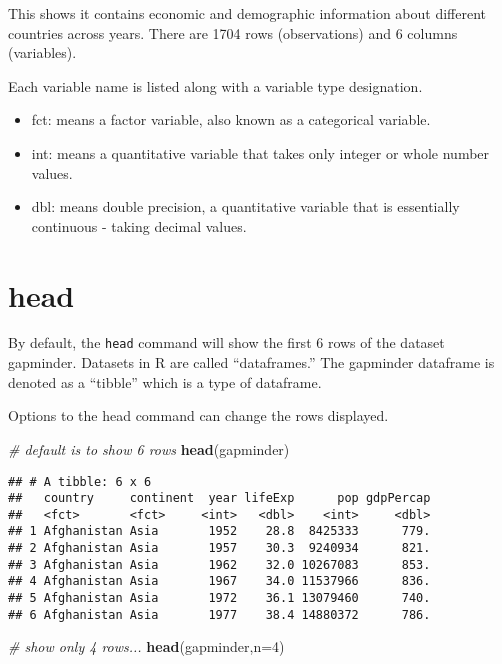 \documentclass[]{book}
\newenvironment{Shaded}{\begin{snugshade}}{\end{snugshade}}
\newcommand{\KeywordTok}[1]{\textcolor[rgb]{0.13,0.29,0.53}{\textbf{#1}}}
\newcommand{\DataTypeTok}[1]{\textcolor[rgb]{0.13,0.29,0.53}{#1}}
\newcommand{\DecValTok}[1]{\textcolor[rgb]{0.00,0.00,0.81}{#1}}
\newcommand{\CommentTok}[1]{\textcolor[rgb]{0.56,0.35,0.01}{\textit{#1}}}
\newcommand{\NormalTok}[1]{#1}
\providecommand{\tightlist}{%
  \setlength{\itemsep}{0pt}\setlength{\parskip}{0pt}}
\begin{document}
This shows it contains economic and demographic information about
different countries across years. There are 1704 rows (observations) and
6 columns (variables).

Each variable name is listed along with a variable type designation.

\begin{itemize}
\tightlist
\item
  fct: means a factor variable, also known as a categorical variable.
\item
  int: means a quantitative variable that takes only integer or whole
  number values.
\item
  dbl: means double precision, a quantitative variable that is
  essentially continuous - taking decimal values.
\end{itemize}

\section{head}\label{head}

By default, the \texttt{head} command will show the first 6 rows of the
dataset gapminder. Datasets in R are called ``dataframes.'' The
gapminder dataframe is denoted as a ``tibble'' which is a type of
dataframe.

Options to the head command can change the rows displayed.

\begin{Shaded}
\begin{Highlighting}[]
\CommentTok{# default is to show 6 rows}
\KeywordTok{head}\NormalTok{(gapminder)}
\end{Highlighting}
\end{Shaded}

\begin{verbatim}
## # A tibble: 6 x 6
##   country     continent  year lifeExp      pop gdpPercap
##   <fct>       <fct>     <int>   <dbl>    <int>     <dbl>
## 1 Afghanistan Asia       1952    28.8  8425333      779.
## 2 Afghanistan Asia       1957    30.3  9240934      821.
## 3 Afghanistan Asia       1962    32.0 10267083      853.
## 4 Afghanistan Asia       1967    34.0 11537966      836.
## 5 Afghanistan Asia       1972    36.1 13079460      740.
## 6 Afghanistan Asia       1977    38.4 14880372      786.
\end{verbatim}

\begin{Shaded}
\begin{Highlighting}[]
\CommentTok{# show only 4 rows...}
\KeywordTok{head}\NormalTok{(gapminder,}\DataTypeTok{n=}\DecValTok{4}\NormalTok{)}
\end{Highlighting}
\end{Shaded}
\end{document}

